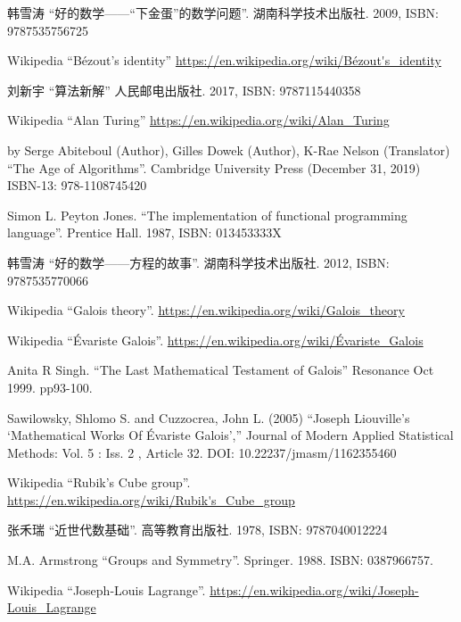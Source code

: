 \documentclass{article}
\begin{document}
\begin{thebibliography}{99}
{\fontspec{\cnmainft}韩雪涛 ``好的数学——“下金蛋”的数学问题''. 湖南科学技术出版社. 2009, ISBN: 9787535756725}

Wikipedia ``Bézout's identity'' \url{https://en.wikipedia.org/wiki/Bézout's_identity}

{\fontspec{\cnmainft}刘新宇 ``算法新解'' 人民邮电出版社. 2017, ISBN: 9787115440358}

Wikipedia ``Alan Turing'' \url{https://en.wikipedia.org/wiki/Alan_Turing}

by Serge Abiteboul (Author), Gilles Dowek (Author), K-Rae Nelson (Translator) ``The Age of Algorithms''. Cambridge University Press (December 31, 2019) ISBN-13: 978-1108745420

Simon L. Peyton Jones. ``The implementation of functional programming language''. Prentice Hall. 1987, ISBN: 013453333X


{\fontspec{\cnmainft}韩雪涛 ``好的数学——方程的故事''. 湖南科学技术出版社.} 2012, ISBN: 9787535770066

Wikipedia ``Galois theory''. \url{https://en.wikipedia.org/wiki/Galois_theory}

Wikipedia ``Évariste Galois''. \url{https://en.wikipedia.org/wiki/Évariste_Galois}

Anita R Singh. ``The Last Mathematical Testament of Galois'' Resonance Oct 1999. pp93-100.

Sawilowsky, Shlomo S. and Cuzzocrea, John L. (2005) ``Joseph Liouville’s `Mathematical Works Of Évariste Galois','' Journal of Modern Applied Statistical Methods: Vol. 5 : Iss. 2 , Article 32. DOI: 10.22237/jmasm/1162355460

Wikipedia ``Rubik's Cube group''. \url{https://en.wikipedia.org/wiki/Rubik's_Cube_group}

{\fontspec{\cnmainft}张禾瑞 ``近世代数基础''. 高等教育出版社.} 1978, ISBN: 9787040012224

M.A. Armstrong ``Groups and Symmetry''. Springer. 1988. ISBN: 0387966757.

Wikipedia ``Joseph-Louis Lagrange''. \url{https://en.wikipedia.org/wiki/Joseph-Louis_Lagrange}


\end{thebibliography}
\end{document}
